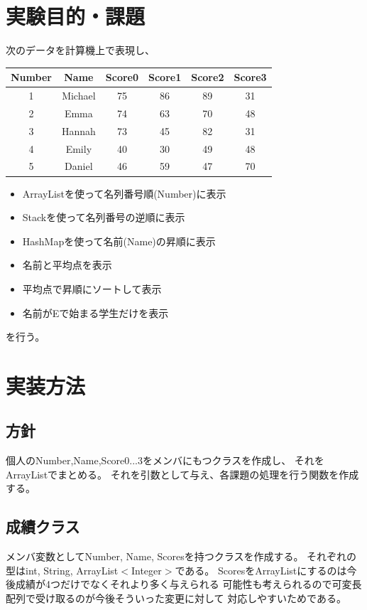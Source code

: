 \documentclass[dvipdfmx]{jsarticle}
\begin{document}
\section{実験目的・課題}
次のデータを計算機上で表現し、
\begin{table}[h]
  \begin{tabular}{cccccc}
    Number & Name & Score0 & Score1 & Score2 & Score3 \\ \hline
    1 & Michael & 75 & 86 & 89 & 31 \\
    2 & Emma & 74 & 63 & 70 & 48 \\
    3 & Hannah & 73 & 45 & 82 & 31 \\
    4 & Emily & 40 & 30 & 49 & 48 \\
    5 & Daniel & 46 & 59 & 47 & 70
  \end{tabular}
\end{table}
\begin{itemize}
  \item ArrayListを使って名列番号順(Number)に表示
  \item Stackを使って名列番号の逆順に表示
  \item HashMapを使って名前(Name)の昇順に表示
  \item 名前と平均点を表示
  \item 平均点で昇順にソートして表示
  \item 名前がEで始まる学生だけを表示
\end{itemize}
を行う。

\section{実装方法}

  \subsection{方針}
  個人のNumber,Name,Score0...3をメンバにもつクラスを作成し、
  それをArrayListでまとめる。
  それを引数として与え、各課題の処理を行う関数を作成する。
  
  \subsection{成績クラス}
  メンバ変数としてNumber, Name, Scoresを持つクラスを作成する。
  それぞれの型はint, String, ArrayList$<$Integer$>$である。
  ScoresをArrayListにするのは今後成績が4つだけでなくそれより多く与えられる
  可能性も考えられるので可変長配列で受け取るのが今後そういった変更に対して
  対応しやすいためである。
\end{document}
